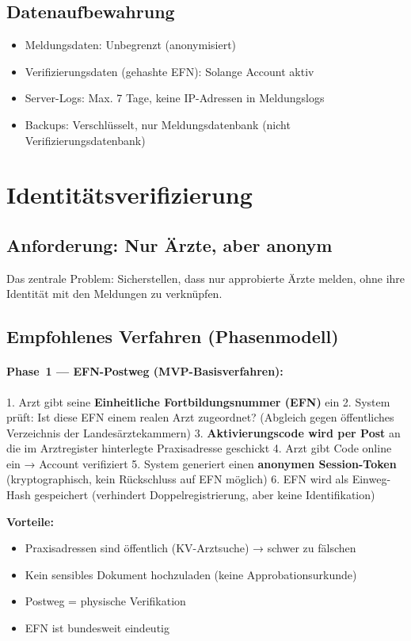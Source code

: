 \documentclass{umbruch-position}
\begin{document}
\subsection{Datenaufbewahrung}

\begin{itemize}[nosep]
  \item Meldungsdaten: Unbegrenzt (anonymisiert)
  \item Verifizierungsdaten (gehashte EFN): Solange Account aktiv
  \item Server-Logs: Max. 7 Tage, keine IP-Adressen in Meldungslogs
  \item Backups: Verschlüsselt, nur Meldungsdatenbank (nicht Verifizierungsdatenbank)
\end{itemize}


\section{Identitätsverifizierung}

\subsection{Anforderung: Nur Ärzte, aber anonym}

Das zentrale Problem: Sicherstellen, dass nur approbierte Ärzte melden, ohne ihre Identität mit den Meldungen zu verknüpfen.

\subsection{Empfohlenes Verfahren (Phasenmodell)}

\paragraph{Phase~1 --- EFN-Postweg (MVP-Basisverfahren):}
1. Arzt gibt seine \textbf{Einheitliche Fortbildungsnummer (EFN)} ein
2. System prüft: Ist diese EFN einem realen Arzt zugeordnet? (Abgleich gegen öffentliches Verzeichnis der Landesärztekammern)
3. \textbf{Aktivierungscode wird per Post} an die im Arztregister hinterlegte Praxisadresse geschickt
4. Arzt gibt Code online ein → Account verifiziert
5. System generiert einen \textbf{anonymen Session-Token} (kryptographisch, kein Rückschluss auf EFN möglich)
6. EFN wird als Einweg-Hash gespeichert (verhindert Doppelregistrierung, aber keine Identifikation)

\textbf{Vorteile:}
\begin{itemize}[nosep]
  \item Praxisadressen sind öffentlich (KV-Arztsuche) → schwer zu fälschen
  \item Kein sensibles Dokument hochzuladen (keine Approbationsurkunde)
  \item Postweg = physische Verifikation
  \item EFN ist bundesweit eindeutig
\end{itemize}
\end{document}
